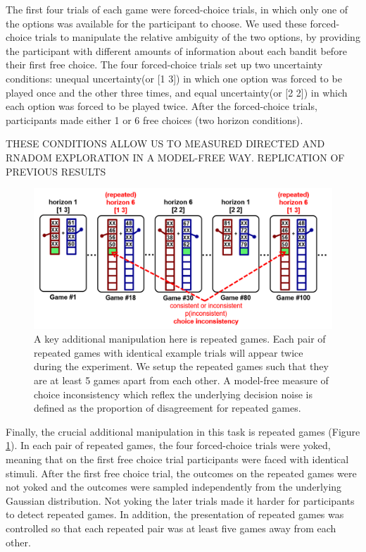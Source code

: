 \documentclass[12pt]{article}
\begin{document}
	The first four trials of each game were forced-choice trials, in which only one of the options was available for the participant to choose. We used these forced-choice trials to manipulate the relative ambiguity of the two options, by providing the participant with different amounts of information about each bandit before their first free choice. The four forced-choice trials set up two uncertainty conditions: unequal uncertainty(or [1 3]) in which one option was forced to be played once and the other three times, and equal uncertainty(or [2 2]) in which each option was forced to be played twice. After the forced-choice trials, participants made either 1 or 6 free choices (two horizon conditions). 
	
	THESE CONDITIONS ALLOW US TO MEASURED DIRECTED AND RNADOM EXPLORATION IN A MODEL-FREE WAY.  REPLICATION OF PREVIOUS RESULTS
	
	\begin{figure}[H]
		\begin{center}
			\includegraphics[width=\textwidth]{figures/taskfig.PNG}
			\caption{A key additional manipulation here is repeated games. Each pair of repeated games with identical example trials will appear twice during the experiment. We setup the repeated games such that they are at least 5 games apart from each other. A model-free measure of choice inconsistency which reflex the underlying decision noise is defined as the proportion of disagreement for repeated games.}
			\label{fig:task2}
		\end{center}
	\end{figure}
	
	Finally, the crucial additional manipulation in this task is repeated games (Figure \ref{fig:task2}). In each pair of repeated games, the four forced-choice trials were yoked, meaning that on the first free choice trial participants were faced with identical stimuli.  After the first free choice trial, the outcomes on the repeated games were not yoked and the outcomes were sampled independently from the underlying Gaussian distribution.  Not yoking the later trials made it harder for participants to detect repeated games.  In addition, the presentation of repeated games was controlled so that each repeated pair was at least five games away from each other. 
	
\end{document}
